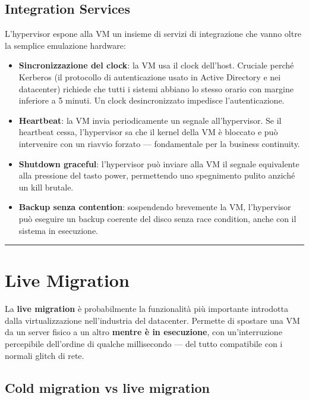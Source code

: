 \documentclass[
  italian,
  openany]{book}
\providecommand{\tightlist}{%
  \setlength{\itemsep}{0pt}\setlength{\parskip}{0pt}}
\begin{document}
\subsection{Integration Services}\label{integration-services}

L'hypervisor espone alla VM un insieme di servizi di integrazione che
vanno oltre la semplice emulazione hardware:

\begin{itemize}
\tightlist
\item
  \textbf{Sincronizzazione del clock}: la VM usa il clock dell'host.
  Cruciale perché Kerberos (il protocollo di autenticazione usato in
  Active Directory e nei datacenter) richiede che tutti i sistemi
  abbiano lo stesso orario con margine inferiore a 5 minuti. Un clock
  desincronizzato impedisce l'autenticazione.
\item
  \textbf{Heartbeat}: la VM invia periodicamente un segnale
  all'hypervisor. Se il heartbeat cessa, l'hypervisor sa che il kernel
  della VM è bloccato e può intervenire con un riavvio forzato ---
  fondamentale per la business continuity.
\item
  \textbf{Shutdown graceful}: l'hypervisor può inviare alla VM il
  segnale equivalente alla pressione del tasto power, permettendo uno
  spegnimento pulito anziché un kill brutale.
\item
  \textbf{Backup senza contention}: sospendendo brevemente la VM,
  l'hypervisor può eseguire un backup coerente del disco senza race
  condition, anche con il sistema in esecuzione.
\end{itemize}

\begin{center}\rule{0.5\linewidth}{0.5pt}\end{center}

\section{Live Migration}\label{live-migration-1}

La \textbf{live migration} è probabilmente la funzionalità più
importante introdotta dalla virtualizzazione nell'industria del
datacenter. Permette di spostare una VM da un server fisico a un altro
\textbf{mentre è in esecuzione}, con un'interruzione percepibile
dell'ordine di qualche millisecondo --- del tutto compatibile con i
normali glitch di rete.

\subsection{Cold migration vs live
migration}\label{cold-migration-vs-live-migration}
\end{document}
